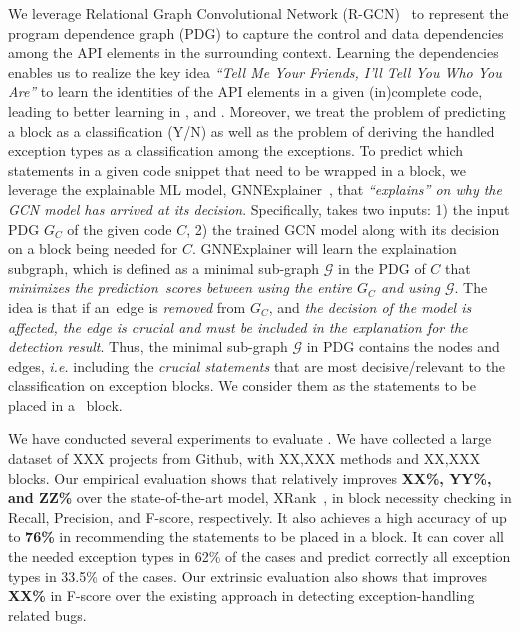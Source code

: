 We leverage Relational Graph Convolutional Network (R-GCN)~\cite{rgcn}
to represent the program dependence graph (PDG) to capture the control
and data dependencies among the API elements in the surrounding
context. Learning the dependencies enables us to realize the
key idea {\em ``Tell Me Your Friends, I'll Tell You Who You Are''} to
learn the identities of the API elements in a given (in)complete code,
leading to better learning in {\xblock}, {\xstate} and
{\xtype}. Moreover, we treat the problem of predicting a
 block as a classification (Y/N) as well as the
problem of deriving the handled exception types as a classification
among the exceptions.
%
To predict which statements in a given code snippet that need to be
wrapped in a  block, we leverage the explainable ML
model, GNNExplainer~\cite{GNNExplainer}, that {\em ``explains'' on why
  the GCN model has arrived at its decision}. Specifically, {\tool}
takes two inputs: 1) the input PDG $G_C$ of the given code $C$,
2) the trained GCN model along with its decision on a
 block being needed for $C$.
%
GNNExplainer will learn the explaination subgraph, which is
defined as a minimal sub-graph $\mathcal{G}$ in the PDG of $C$ that
{\em minimizes the prediction~scores between using the entire $G_C$
  and using $\mathcal{G}$}. The idea is that if an~edge is {\em
  removed} from $G_C$, and {\em the decision of the model is affected,
  the edge is crucial and must be included in the explanation for
  the detection result}. Thus, the minimal sub-graph $\mathcal{G}$ in
PDG contains the nodes and edges, {\em i.e.}  including the {\em
  crucial statements} that are most decisive/relevant to the
classification on exception blocks. We consider them as the statements
to be placed in a ~block.

We have conducted several experiments to evaluate {\tool}. We have
collected a large dataset of XXX projects from Github, with XX,XXX
methods and XX,XXX  blocks.
%
Our empirical evaluation shows that {\tool} relatively improves {\bf
  XX\%, YY\%, and ZZ\%} over the state-of-the-art model,
XRank~\cite{xrank-fse20}, in  block necessity checking
in Recall, Precision, and F-score, respectively. It also achieves a
high accuracy of up to {\bf 76\%} in recommending the statements to be
placed in a  block. It can cover all the needed
exception types in 62\% of the cases and predict correctly all
exception types in 33.5\% of the cases. Our extrinsic evaluation also
shows that {\tool} improves {\bf XX\%} in F-score over the existing
approach in detecting exception-handling related bugs.

